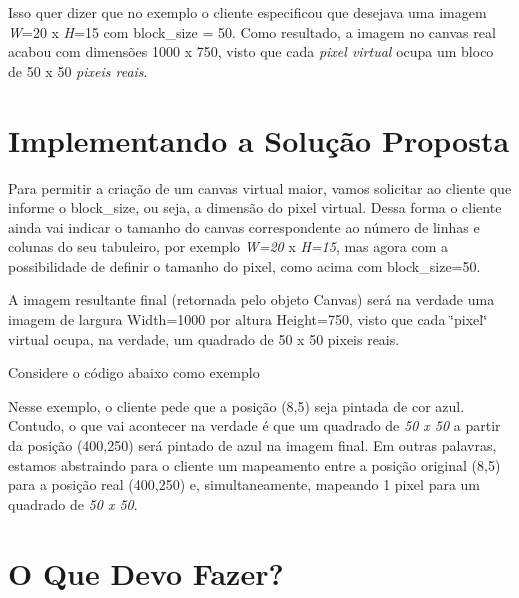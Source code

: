 Isso quer dizer que no exemplo o cliente especificou que desejava uma imagem {\itshape W}=20 x {\itshape H}=15 com {\ttfamily block\+\_\+size} = 50. Como resultado, a imagem no canvas real acabou com dimensões 1000 x 750, visto que cada {\itshape pixel virtual} ocupa um bloco de 50 x 50 {\itshape pixeis reais}.



\section*{Implementando a Solução Proposta}

Para permitir a criação de um canvas virtual maior, vamos solicitar ao cliente que informe o {\ttfamily block\+\_\+size}, ou seja, a dimensão do pixel virtual. Dessa forma o cliente ainda vai indicar o tamanho do canvas correspondente ao número de linhas e colunas do seu tabuleiro, por exemplo {\itshape W=20} x {\itshape H=15}, mas agora com a possibilidade de definir o tamanho do pixel, como acima com {\ttfamily block\+\_\+size=50}.

A imagem resultante final (retornada pelo objeto {\ttfamily Canvas}) será na verdade uma imagem de largura {\ttfamily Width=1000} por altura {\ttfamily Height=750}, visto que cada \char`\"{}pixel\char`\"{} virtual ocupa, na verdade, um quadrado de 50 x 50 pixeis reais.

Considere o código abaixo como exemplo


\begin{DoxyCode}{0}
\DoxyCodeLine{}
\end{DoxyCode}


Nesse exemplo, o cliente pede que a posição {\ttfamily (8,5)} seja pintada de cor azul. Contudo, o que vai acontecer na verdade é que um quadrado de {\itshape 50 x 50} a partir da posição {\ttfamily (400,250)} será pintado de azul na imagem final. Em outras palavras, estamos abstraindo para o cliente um mapeamento entre a posição original {\ttfamily (8,5)} para a posição real {\ttfamily (400,250)} e, simultaneamente, mapeando 1 pixel para um quadrado de {\itshape 50 x 50}.

\section*{O Que Devo Fazer?}

